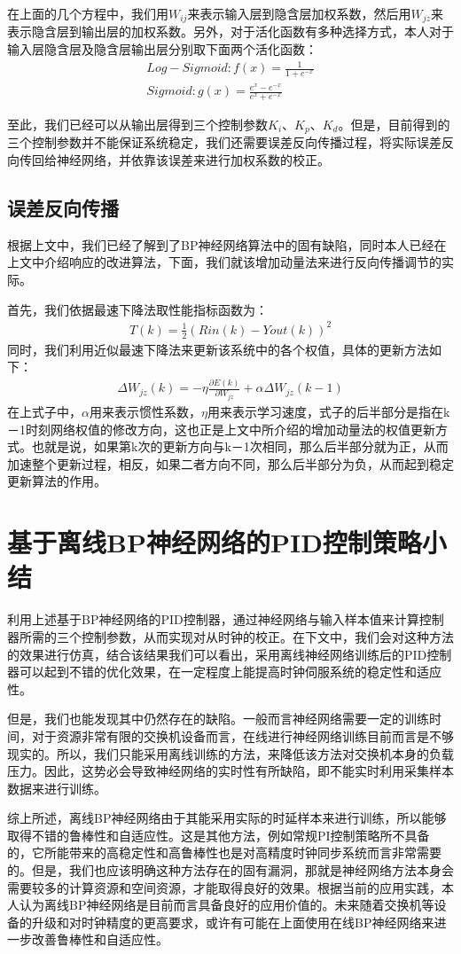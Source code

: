 在上面的几个方程中，我们用$W_{ij}$来表示输入层到隐含层加权系数，然后用$W_{jz}$来表示隐含层到输出层的加权系数。另外，对于活化函数有多种选择方式，本人对于输入层\-隐含层及隐含层\-输出层分别取下面两个活化函数：
\begin{align}
Log-Sigmoid : f(x) = \frac{1}{1 + e^{-x}} \\
Sigmoid : g(x) = \frac{e^{x} - e^{-x}}{e^{x} + e^{-x}}
\end{align}

至此，我们已经可以从输出层得到三个控制参数$K_{i}$、$K_{p}$、$K_{d}$。但是，目前得到的三个控制参数并不能保证系统稳定，我们还需要误差反向传播过程，将实际误差反向传回给神经网络，并依靠该误差来进行加权系数的校正。

\subsection{误差反向传播}
根据上文中，我们已经了解到了BP神经网络算法中的固有缺陷，同时本人已经在上文中介绍响应的改进算法，下面，我们就该增加动量法来进行反向传播调节的实际。

首先，我们依据最速下降法取性能指标函数为：
\begin{align}
T(k) = \frac{1}{2}(Rin(k) - Yout(k))^{2}
\end{align}
同时，我们利用近似最速下降法来更新该系统中的各个权值，具体的更新方法如下：
\begin{align}
\Delta W_{jz}(k) = -\eta \frac{\partial E(k)}{\partial W_{jz}} + \alpha \Delta W_{jz}(k-1)
\end{align}
在上式子中，$\alpha$用来表示惯性系数，$\eta$用来表示学习速度，式子的后半部分是指在k－1时刻网络权值的修改方向，这也正是上文中所介绍的增加动量法的权值更新方式。也就是说，如果第k次的更新方向与k－1次相同，那么后半部分就为正，从而加速整个更新过程，相反，如果二者方向不同，那么后半部分为负，从而起到稳定更新算法的作用。

\section{基于离线BP神经网络的PID控制策略小结}
利用上述基于BP神经网络的PID控制器，通过神经网络与输入样本值来计算控制器所需的三个控制参数，从而实现对从时钟的校正。在下文中，我们会对这种方法的效果进行仿真，结合该结果我们可以看出，采用离线神经网络训练后的PID控制器可以起到不错的优化效果，在一定程度上能提高时钟伺服系统的稳定性和适应性。

但是，我们也能发现其中仍然存在的缺陷。一般而言神经网络需要一定的训练时间，对于资源非常有限的交换机设备而言，在线进行神经网络训练目前而言是不够现实的。所以，我们只能采用离线训练的方法，来降低该方法对交换机本身的负载压力。因此，这势必会导致神经网络的实时性有所缺陷，即不能实时利用采集样本数据来进行训练。

综上所述，离线BP神经网络由于其能采用实际的时延样本来进行训练，所以能够取得不错的鲁棒性和自适应性。这是其他方法，例如常规PI控制策略所不具备的，它所能带来的高稳定性和高鲁棒性也是对高精度时钟同步系统而言非常需要的。但是，我们也应该明确这种方法存在的固有漏洞，那就是神经网络方法本身会需要较多的计算资源和空间资源，才能取得良好的效果。根据当前的应用实践，本人认为离线BP神经网络是目前而言具备良好的应用价值的。未来随着交换机等设备的升级和对时钟精度的更高要求，或许有可能在上面使用在线BP神经网络来进一步改善鲁棒性和自适应性。







